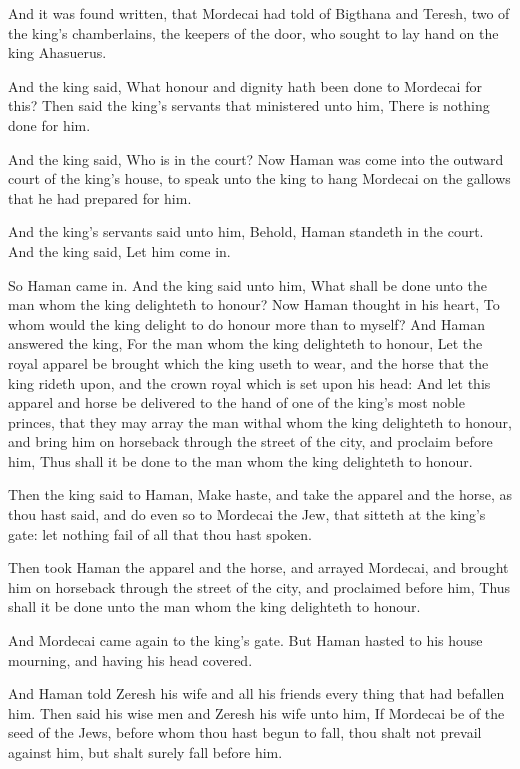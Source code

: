 \verse And it was found written, that Mordecai had told of Bigthana and Teresh, two of the king's chamberlains, the keepers of the door, who sought to lay hand on the king Ahasuerus.

\verse And the king said, What honour and dignity hath been done to Mordecai for this? Then said the king's servants that ministered unto him, There is nothing done for him.

\verse And the king said, Who is in the court? Now Haman was come into the outward court of the king's house, to speak unto the king to hang Mordecai on the gallows that he had prepared for him.

\verse And the king's servants said unto him, Behold, Haman standeth in the court. And the king said, Let him come in.

\verse So Haman came in. And the king said unto him, What shall be done unto the man whom the king delighteth to honour? Now Haman thought in his heart, To whom would the king delight to do honour more than to myself?  \verse And Haman answered the king, For the man whom the king delighteth to honour, \verse Let the royal apparel be brought which the king useth to wear, and the horse that the king rideth upon, and the crown royal which is set upon his head: \verse And let this apparel and horse be delivered to the hand of one of the king's most noble princes, that they may array the man withal whom the king delighteth to honour, and bring him on horseback through the street of the city, and proclaim before him, Thus shall it be done to the man whom the king delighteth to honour.

\verse Then the king said to Haman, Make haste, and take the apparel and the horse, as thou hast said, and do even so to Mordecai the Jew, that sitteth at the king's gate: let nothing fail of all that thou hast spoken.

\verse Then took Haman the apparel and the horse, and arrayed Mordecai, and brought him on horseback through the street of the city, and proclaimed before him, Thus shall it be done unto the man whom the king delighteth to honour.

\verse And Mordecai came again to the king's gate. But Haman hasted to his house mourning, and having his head covered.

\verse And Haman told Zeresh his wife and all his friends every thing that had befallen him. Then said his wise men and Zeresh his wife unto him, If Mordecai be of the seed of the Jews, before whom thou hast begun to fall, thou shalt not prevail against him, but shalt surely fall before him.

